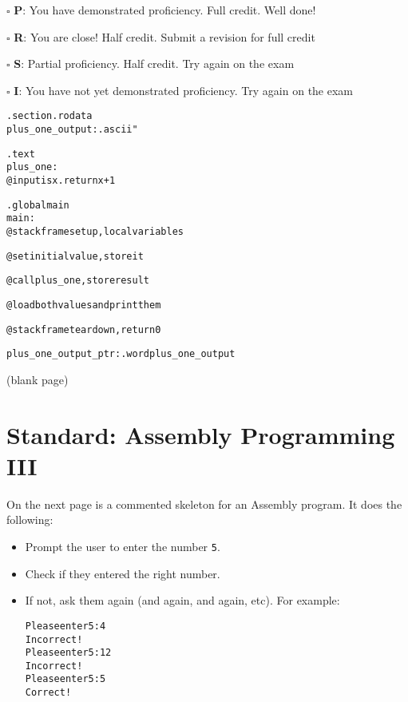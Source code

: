 \documentclass[12pt]{article}
\begin{document}
$\square$ \textbf{P}: You have demonstrated proficiency. Full credit. Well done!

$\square$ \textbf{R}: You are close! Half credit. Submit a revision for full credit

$\square$ \textbf{S}: Partial proficiency. Half credit. Try again on the exam

$\square$ \textbf{I}: You have not yet demonstrated proficiency. Try again on the exam

\newpage

\begin{alltt}
    .section .rodata
plus_one_output: .ascii "%d + 1 = %d{\textbackslash}n{\textbackslash}0"

    .text
plus_one:
    @ input is x. return x+1


    .global main
main: 
    @ stack frame setup, local variables


    @ set initial value, store it


    @ call plus_one, store result


    @ load both values and print them


    @ stack frame teardown, return 0


plus_one_output_ptr: .word plus_one_output
\end{alltt}

\newpage

\begin{center}
(blank page)
\end{center}

\newpage

\section*{Standard: Assembly Programming III}

On the next page is a commented skeleton for an Assembly program. It does the following:
\begin{itemize}
    \item Prompt the user to enter the number \texttt{5}.
    \item Check if they entered the right number.
    \item If not, ask them again (and again, and again, etc). For example:
    \begin{alltt}
    Please enter 5: 4
    Incorrect!
    Please enter 5: 12
    Incorrect!
    Please enter 5: 5
    Correct!
    \end{alltt}
\end{itemize}
\end{document}
